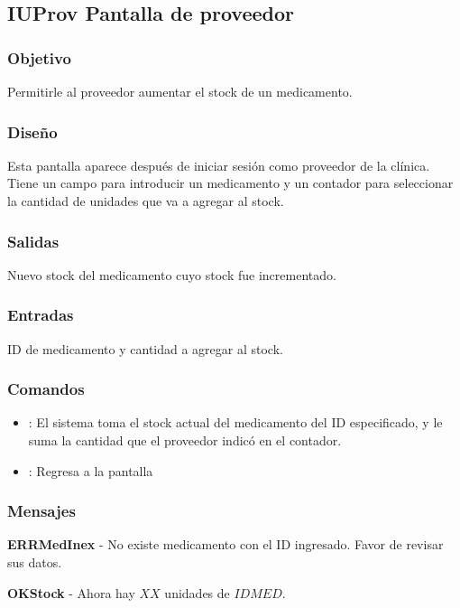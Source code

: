 \subsection{IUProv Pantalla de proveedor}

\subsubsection{Objetivo}
	Permitirle al proveedor aumentar el stock de un medicamento.

\subsubsection{Diseño}
	Esta pantalla aparece despu\'es de iniciar sesi\'on como proveedor de la cl\'inica. Tiene un campo para introducir un medicamento y un contador para seleccionar la cantidad de unidades que va a agregar al stock.


\subsubsection{Salidas}

	Nuevo stock del medicamento cuyo stock fue incrementado.

\subsubsection{Entradas}
ID de medicamento y cantidad a agregar al stock.

\subsubsection{Comandos}
\begin{itemize}
		\item {}: El sistema toma el stock actual del medicamento del ID especificado, y le suma la cantidad que el proveedor indic\'o en el contador.
		\item {}: Regresa a la pantalla \label{CU1_1Login}
\end{itemize}

\subsubsection{Mensajes}
	\begin{Citemize}
		\item {\bf ERRMedInex} - No existe medicamento con el ID ingresado. Favor de revisar sus datos.
		\item {\bf OKStock} - Ahora hay $XX$ unidades de $IDMED$.
	\end{Citemize}